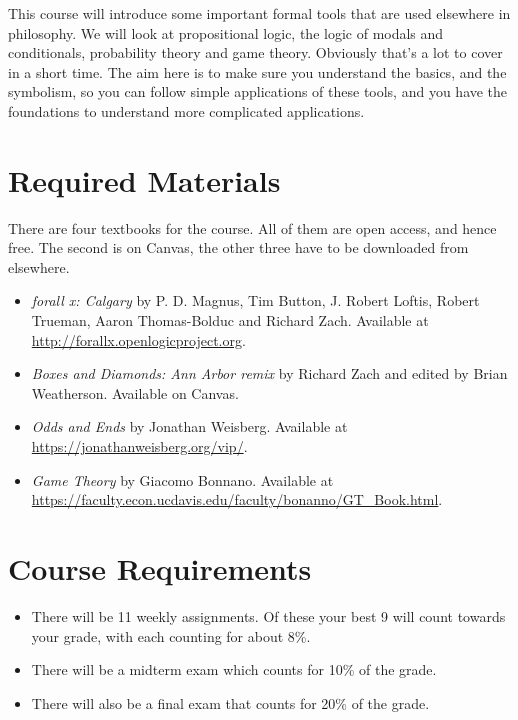 \documentclass[
  letterpaper,
  DIV=11,
  numbers=noendperiod]{scrartcl}
\providecommand{\tightlist}{%
  \setlength{\itemsep}{0pt}\setlength{\parskip}{0pt}}
\begin{document}
This course will introduce some important formal tools that are used
elsewhere in philosophy. We will look at propositional logic, the logic
of modals and conditionals, probability theory and game theory.
Obviously that's a lot to cover in a short time. The aim here is to make
sure you understand the basics, and the symbolism, so you can follow
simple applications of these tools, and you have the foundations to
understand more complicated applications.

\section{Required Materials}\label{required-materials}

There are four textbooks for the course. All of them are open access,
and hence free. The second is on Canvas, the other three have to be
downloaded from elsewhere.

\begin{itemize}
\tightlist
\item
  \emph{forall x: Calgary} by P. D. Magnus, Tim Button, J. Robert
  Loftis, Robert Trueman, Aaron Thomas-Bolduc and Richard Zach.
  Available at \url{http://forallx.openlogicproject.org}.
\item
  \emph{Boxes and Diamonds: Ann Arbor remix} by Richard Zach and edited
  by Brian Weatherson. Available on Canvas.
\item
  \emph{Odds and Ends} by Jonathan Weisberg. Available at
  \url{https://jonathanweisberg.org/vip/}.
\item
  \emph{Game Theory} by Giacomo Bonnano. Available at
  \url{https://faculty.econ.ucdavis.edu/faculty/bonanno/GT_Book.html}.
\end{itemize}

\section{Course Requirements}\label{course-requirements}

\begin{itemize}
\tightlist
\item
  There will be 11 weekly assignments. Of these your best 9 will count
  towards your grade, with each counting for about 8\%.
\item
  There will be a midterm exam which counts for 10\% of the grade.
\item
  There will also be a final exam that counts for 20\% of the grade.
\end{itemize}
\end{document}
